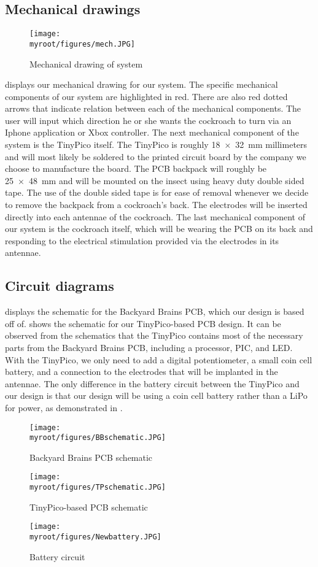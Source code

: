 \documentclass[twocolumn,10pt]{IEEEtran}
\newcommand{\myroot}{.}
\begin{document}
\subsection{Mechanical drawings}
\begin{figure}[ht!]
\centering
\texttt{[image: \\myroot/figures/mech.JPG]}
\caption{Mechanical drawing of system}
\label{fig:mech}
\end{figure}
 displays our mechanical drawing for our system. The specific mechanical components of our system are highlighted in red. There are also red dotted arrows that indicate relation between each of the mechanical components. The user will input which direction he or she wants the cockroach to turn via an Iphone application or Xbox controller. The next mechanical component of the system is the TinyPico itself. The TinyPico is roughly \SI{18x32}{\milli\meter} millimeters and will most likely be soldered to the printed circuit board by the company we choose to manufacture the board. The PCB backpack will roughly be \SI{25x48}{\milli\meter} and will be mounted on the insect using heavy duty double sided tape. The use of the double sided tape is for ease of removal whenever we decide to remove the backpack from a cockroach's back. The electrodes will be inserted directly into each antennae of the cockroach. The last mechanical component of our system is the cockroach itself, which will be wearing the PCB on its back and responding to the electrical stimulation provided via the electrodes in its antennae.

\subsection{Circuit diagrams}
 displays the schematic for the Backyard Brains PCB, which our design is based off of.  shows the schematic for our TinyPico-based PCB design. It can be observed from the schematics that the TinyPico contains most of the necessary parts from the Backyard Brains PCB, including a processor, PIC, and LED. With the TinyPico, we only need to add a digital potentiometer, a small coin cell battery, and a connection to the electrodes that will be implanted in the antennae. The only difference in the battery circuit between the TinyPico and our design is that our design will be using a coin cell battery rather than a LiPo for power, as demonstrated in .
\begin{figure}[ht!]
\centering
\texttt{[image: \\myroot/figures/BBschematic.JPG]}
\caption{Backyard Brains PCB schematic}
\label{fig:bbs}
\end{figure}
\begin{figure}[ht!]
\centering
\texttt{[image: \\myroot/figures/TPschematic.JPG]}
\caption{TinyPico-based PCB schematic}
\label{fig:tps}
\end{figure}
\begin{figure}[ht!]
\centering
\texttt{[image: \\myroot/figures/Newbattery.JPG]}
\caption{Battery circuit}
\label{fig:newbatt}
\end{figure}
\end{document}
